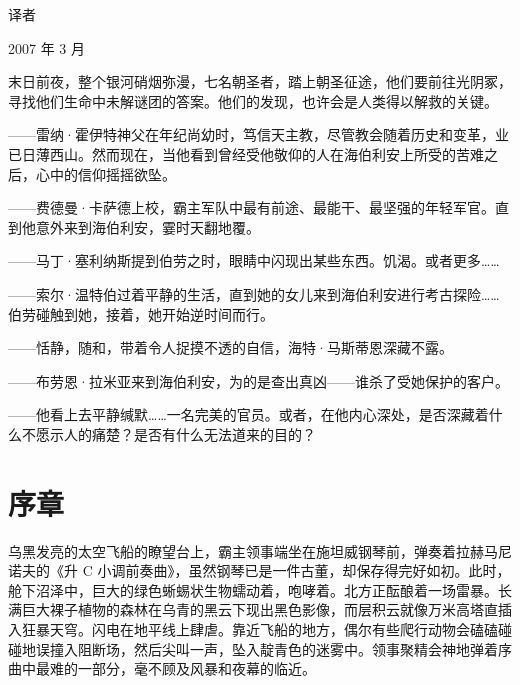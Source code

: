 \documentclass[AutoFakeBold=true]{book}
\begin{document}
\begin{flushright}
	译者

	2007 年 3 月
\end{flushright}

\newpage
\pagestyle{empty}

末日前夜，整个银河硝烟弥漫，七名朝圣者，踏上朝圣征途，他们要前往光阴冢，寻找他们生命中未解谜团的答案。他们的发现，也许会是人类得以解救的关键。

\vspace{1em}{\heiti 牧师}——雷纳·霍伊特神父在年纪尚幼时，笃信天主教，尽管教会随着历史和变革，业已日薄西山。然而现在，当他看到曾经受他敬仰的人在海伯利安上所受的苦难之后，心中的信仰摇摇欲坠。

\vspace{1em}{\heiti 士兵}——费德曼·卡萨德上校，霸主军队中最有前途、最能干、最坚强的年轻军官。直到他意外来到海伯利安，霎时天翻地覆。

\vspace{1em}{\heiti 诗人}——马丁·塞利纳斯提到伯劳之时，眼睛中闪现出某些东西。饥渴。或者更多……

\vspace{1em}{\heiti 学者}——索尔·温特伯过着平静的生活，直到她的女儿来到海伯利安进行考古探险……伯劳碰触到她，接着，她开始逆时间而行。

\vspace{1em}{\heiti 船长}——恬静，随和，带着令人捉摸不透的自信，海特·马斯蒂恩深藏不露。

\vspace{1em}{\heiti 侦探}——布劳恩·拉米亚来到海伯利安，为的是查出真凶——谁杀了受她保护的客户。

\vspace{1em}{\heiti 领事}——他看上去平静缄默……一名完美的官员。或者，在他内心深处，是否深藏着什么不愿示人的痛楚？是否有什么无法道来的目的？

\newpage
\pagestyle{headings}

\chapter{序章}

乌黑发亮的太空飞船的瞭望台上，霸主领事端坐在施坦威钢琴前，弹奏着拉赫马尼诺夫的《升 C 小调前奏曲》，虽然钢琴已是一件古董，却保存得完好如初。此时，舱下沼泽中，巨大的绿色蜥蜴状生物蠕动着，咆哮着。北方正酝酿着一场雷暴。长满巨大裸子植物的森林在乌青的黑云下现出黑色影像，而层积云就像万米高塔直插入狂暴天穹。闪电在地平线上肆虐。靠近飞船的地方，偶尔有些爬行动物会磕磕碰碰地误撞入阻断场，然后尖叫一声，坠入靛青色的迷雾中。领事聚精会神地弹着序曲中最难的一部分，毫不顾及风暴和夜幕的临近。
\end{document}
